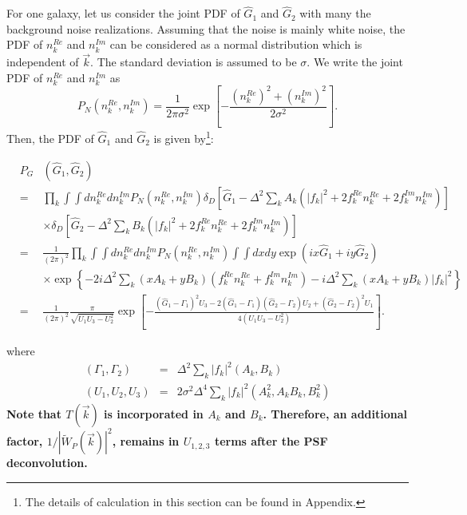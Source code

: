 \documentclass[twocolumn]{aastex62}
\begin{document}
For one galaxy, let us consider the joint PDF of $\hat{G}_1$ and $\hat{G}_2$ with many the background noise realizations. Assuming that the noise is mainly white noise, the PDF of $n_k^{Re}$ and $n_k^{Im}$ can be considered as a normal distribution which is independent of $\vec{k}$. The standard deviation is assumed to be $\sigma$. We write the joint PDF of $n_k^{Re}$ and $n_k^{Im}$ as
\begin{equation}
P_N(n_k^{Re},n_k^{Im})=\frac{1}{2\pi\sigma^2}\exp\left[-\frac{\left(n_k^{Re}\right)^2+\left(n_k^{Im}\right)^2}{2\sigma^2}\right].
\end{equation}
Then, the PDF of $\hat{G}_1$ and $\hat{G}_2$ is given by\footnote{The details of calculation in this section can be found in Appendix.}:
\begin{widetext}
\begin{eqnarray}
\label{Eq:Pgg_1}
&P_G&\left(\hat{G}_1,\hat{G}_2\right)\\ \nonumber
&=&\prod_k\int\int dn_k^{Re}dn_k^{Im}P_N(n_k^{Re},n_k^{Im})
\delta_D\left[\hat{G}_1-\Delta^2\sum_kA_k\left(\vert f_k\vert^2+2f_k^{Re}n_k^{Re}+2f_k^{Im}n_k^{Im}\right)\right]\\ \nonumber
&&\times\delta_D\left[\hat{G}_2-\Delta^2\sum_kB_k\left(\vert f_k\vert^2+2f_k^{Re}n_k^{Re}+2f_k^{Im}n_k^{Im}\right)\right]\\ \nonumber
&=&\frac{1}{(2\pi)^2}\prod_k\int\int dn_k^{Re}dn_k^{Im}P_N(n_k^{Re},n_k^{Im})
\int\int dxdy \exp\left(ix\hat{G}_1+iy\hat{G}_2\right)\\ \nonumber
&&\times\exp\left\{-2i\Delta^2\sum_k(xA_k+yB_k)\left(f_k^{Re}n_k^{Re}+f_k^{Im}n_k^{Im}\right)-i\Delta^2\sum_k(xA_k+yB_k)\vert f_k\vert^2\right\} \\ \nonumber
&=&\frac{1}{(2\pi)^2}\frac{\pi}{\sqrt{U_1U_3-U_2^2}}\exp\left[-\frac{\left(\hat{G}_1-\Gamma_1\right)^2U_3-2\left(\hat{G}_1-\Gamma_1\right)\left(\hat{G}_2-\Gamma_2\right)U_2+\left(\hat{G}_2-\Gamma_2\right)^2U_1}{4(U_1U_3-U_2^2)}\right].
\end{eqnarray}
\end{widetext}
where
\begin{eqnarray}
\left(\Gamma_1,\Gamma_2\right)&=&\Delta^2\sum_k\vert f_k\vert^2\left(A_k,B_k\right)\\ \nonumber
\left(U_1,U_2,U_3\right)&=&2\sigma^2\Delta^4\sum_k\vert f_k\vert^2\left(A_k^2,A_kB_k,B_k^2\right)
\end{eqnarray}
\textbf{Note that $T(\vec{k})$ is incorporated in $A_k$ and $B_k$. Therefore, an additional factor, $1/|\widetilde{W}_{P}(\vec{k})|^2$, remains in $U_{1,2,3}$ terms after the PSF deconvolution.}
\end{document}
